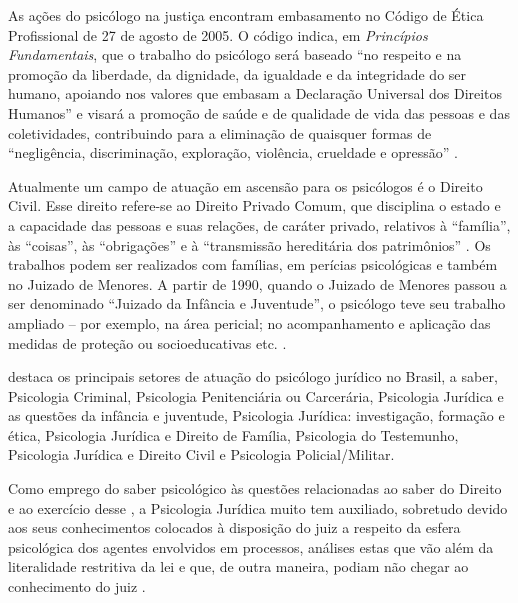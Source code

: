 As ações do psicólogo na justiça encontram embasamento no Código de Ética Profissional de 27 de agosto de 2005. O código indica, em \emph{Princípios Fundamentais}, que o trabalho do psicólogo será baseado ``no respeito e na promoção da liberdade, da dignidade, da igualdade e da integridade do ser humano, apoiando nos valores que embasam a Declaração Universal dos Direitos Humanos'' e visará a promoção de saúde e de qualidade de vida das pessoas e das coletividades, contribuindo para a eliminação de quaisquer formas de ``negligência, discriminação, exploração, violência, crueldade e opressão'' \cite[p. 27]{LIMA2008}. 

Atualmente um campo de atuação em ascensão para os psicólogos é o Direito Civil. Esse direito refere-se ao Direito Privado Comum, que disciplina o estado e a capacidade das pessoas e suas relações, de caráter privado, relativos à ``família'', às ``coisas'', às ``obrigações'' e à ``transmissão hereditária dos patrimônios'' . Os trabalhos podem ser realizados com famílias, em perícias psicológicas e também no Juizado de Menores. A partir de 1990, quando o Juizado de Menores passou a ser denominado ``Juizado da Infância e Juventude'', o psicólogo teve seu trabalho ampliado -- por exemplo, na área pericial; no acompanhamento e aplicação das medidas de proteção ou socioeducativas etc. .

 destaca os principais setores de atuação do psicólogo jurídico no Brasil, a saber, Psicologia Criminal, Psicologia Penitenciária ou Carcerária, Psicologia Jurídica e as questões da infância e juventude, Psicologia Jurídica: investigação, formação e ética, Psicologia Jurídica e Direito de Família, Psicologia do Testemunho, Psicologia Jurídica e Direito Civil e Psicologia Policial/Militar. 

Como emprego do saber psicológico às questões relacionadas ao saber do Direito e ao exercício desse \cite{LEAL2008}, a Psicologia Jurídica muito tem auxiliado, sobretudo devido aos seus conhecimentos colocados à disposição do juiz a respeito da esfera psicológica dos agentes envolvidos em processos, análises estas que vão além da literalidade restritiva da lei e que, de outra maneira, podiam não chegar ao conhecimento do juiz .

